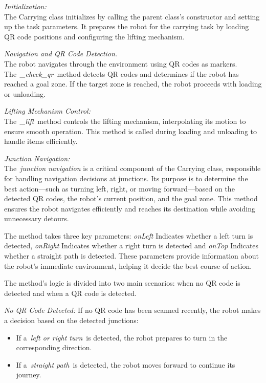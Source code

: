 \documentclass[a4paper,12pt]{extreport}
\begin{document}
\emph{Initialization:}\\
The Carrying class initializes by calling the parent class's constructor
and setting up the task parameters. It prepares the robot for the
carrying task by loading QR code positions and configuring the lifting
mechanism.

\emph{Navigation and QR Code Detection.}\\
The robot navigates through the environment using QR codes as markers.
The~\emph{\_check\_qr}~method detects QR codes and determines if the
robot has reached a goal zone. If the target zone is reached, the robot
proceeds with loading or unloading.

\emph{Lifting Mechanism Control:}\\
The~\emph{\_lift}~method controls the lifting mechanism, interpolating
its motion to ensure smooth operation. This method is called during
loading and unloading to handle items efficiently.

\emph{Junction Navigation:}\\
The~\emph{junction navigation} is a critical component of the Carrying
class, responsible for handling navigation decisions at junctions. Its
purpose is to determine the best action---such as turning left, right,
or moving forward---based on the detected QR codes, the robot's current
position, and the goal zone. This method ensures the robot navigates
efficiently and reaches its destination while avoiding unnecessary
detours.

The method takes three key parameters: \emph{onLeft} Indicates whether a
left turn is detected, \emph{onRight} Indicates whether a right turn is
detected and \emph{onTop} Indicates whether a straight path is detected.
These parameters provide information about the robot's immediate
environment, helping it decide the best course of action.

The method's logic is divided into two main scenarios: when no QR code
is detected and when a QR code is detected.

\emph{No QR Code Detected:} If no QR code has been scanned recently, the
robot makes a decision based on the detected junctions:

\begin{itemize}
\item
  If a~\emph{left or right turn}~is detected, the robot prepares to turn
  in the corresponding direction.
\item
  If a~\emph{straight path}~is detected, the robot moves forward to
  continue its journey.
\end{itemize}
\end{document}
